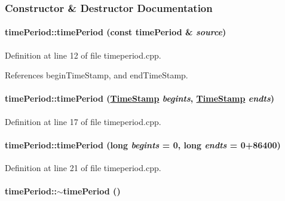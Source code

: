 \subsubsection{Constructor \& Destructor Documentation}
\hypertarget{classtimePeriod_timePerioda0}{
\paragraph[timePeriod]{\setlength{\rightskip}{0pt plus 5cm}time\-Period::time\-Period (const time\-Period \& {\em source})}\hfill}
\label{classtimePeriod_timePerioda0}




Definition at line 12 of file timeperiod.cpp.

References begin\-Time\-Stamp, and end\-Time\-Stamp.\hypertarget{classtimePeriod_timePerioda1}{
\paragraph[timePeriod]{\setlength{\rightskip}{0pt plus 5cm}time\-Period::time\-Period (\hyperlink{classTimeStamp}{Time\-Stamp} {\em begints}, \hyperlink{classTimeStamp}{Time\-Stamp} {\em endts})}\hfill}
\label{classtimePeriod_timePerioda1}




Definition at line 17 of file timeperiod.cpp.\hypertarget{classtimePeriod_timePerioda2}{
\paragraph[timePeriod]{\setlength{\rightskip}{0pt plus 5cm}time\-Period::time\-Period (long {\em begints} = 0, long {\em endts} = 0+86400)}\hfill}
\label{classtimePeriod_timePerioda2}




Definition at line 21 of file timeperiod.cpp.\hypertarget{classtimePeriod_timePerioda3}{
\paragraph[$\sim$timePeriod]{\setlength{\rightskip}{0pt plus 5cm}time\-Period::$\sim$time\-Period ()}\hfill}
\label{classtimePeriod_timePerioda3}




